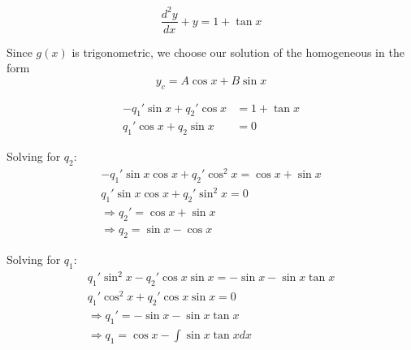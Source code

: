 \documentclass[a4paper,10pt]{article}
\begin{document}
\begin{ex}
	\[
		\frac{d^2y}{dx} + y = 1 + \tan x
	\]

	Since $g(x)$ is trigonometric, we choose our solution of the
	homogeneous in the form
	\[
		y_c = A\cos x + B\sin x
	\]

	\begin{align*}
		-q_1'\sin x + q_2'\cos x &= 1 + \tan x \\
		q_1'\cos x + q_2\sin x &= 0
	\end{align*}

	Solving for $q_2$:
	\begin{gather*}
		-q_1'\sin x \cos x + q_2'\cos^2x = \cos x + \sin x \\
		q_1' \sin x \cos x + q_2'\sin^2x = 0\\
		\Rightarrow q_2' = \cos x + \sin x \\
		\Rightarrow q_2 = \sin x - \cos x
	\end{gather*}

	Solving for $q_1$:
	\begin{gather*}
		q_1'\sin^2x - q_2'\cos x \sin x = -\sin x - \sin x \tan x \\
		q_1'\cos^2x + q_2'\cos x \sin x = 0 \\
		\Rightarrow q_1' = -\sin x - \sin x \tan x \\
		\Rightarrow q_1 = \cos x - \int \sin x \tan x dx
	\end{gather*}
\end{ex}
\end{document}
